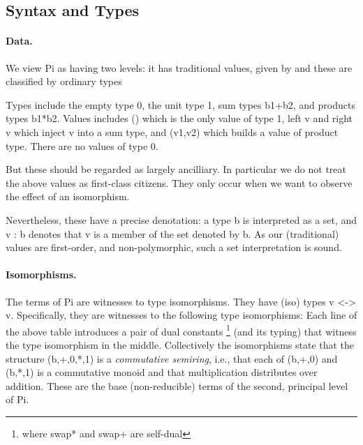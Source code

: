 \documentclass[preprint]{sigplanconf}
\begin{document}
\subsection{Syntax and Types} 
\label{sec:pi-syntax}

\paragraph*{Data.}
We view {{Pi}} as having two levels:  it has traditional values, given by
and these are classified by ordinary types

Types include the empty type {{0}}, the unit type {{1}}, sum types {{b1+b2}},
and products types {{b1*b2}}.  Values includes {{()}} which is the only value
of type {{1}}, {{left v}} and {{right v}} which inject {{v}} into a sum type,
and {{(v1,v2)}} which builds a value of product type. There are no values of
type {{0}}.

But these should be regarded as largely ancilliary.  In particular we
do not treat the above values as first-class citizens.  They only occur
when we want to observe the effect of an isomorphism.

Nevertheless, these have a precise denotation:  a type {{b}} is 
interpreted as a set, and {{v : b}}  denotes that {{v}} is a member
of the set denoted by {{b}}.  As our (traditional) values are first-order,
and non-polymorphic, such a set interpretation is sound.

\paragraph*{Isomorphisms.} The terms of {{Pi}} are witnesses to type
isomorphisms.  They have (iso) types {{v <-> v}}.  
Specifically, they are witnesses to the following type isomorphisms:
Each line of the above table introduces a pair of dual constants%
\footnote{where {{swap*}} and {{swap+}} are self-dual} (and its typing)
that witness the type isomorphism in the middle.  Collectively the isomorphisms
state that the structure {{(b,+,0,*,1)}} is a \emph{commutative semiring},
i.e., that each of {{(b,+,0)}} and {{(b,*,1)}} is a commutative monoid and that
multiplication distributes over addition.  These are the base 
(non-reducible) terms of the second, principal level of {{Pi}}.
\end{document}
